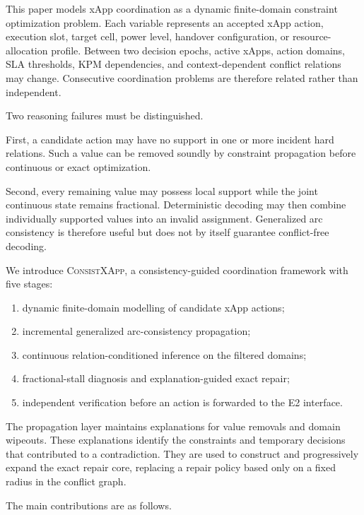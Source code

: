 \documentclass[pdflatex,sn-mathphys-num,iicol,oneside]{sn-jnl}
\newcommand{\method}{\textsc{ConsistXApp}}
\begin{document}
This paper models xApp coordination as a dynamic finite-domain
constraint optimization problem. Each variable represents an accepted
xApp action, execution slot, target cell, power level, handover
configuration, or resource-allocation profile. Between two decision
epochs, active xApps, action domains, SLA thresholds, KPM dependencies,
and context-dependent conflict relations may change. Consecutive
coordination problems are therefore related rather than independent.

Two reasoning failures must be distinguished.

First, a candidate action may have no support in one or more incident
hard relations. Such a value can be removed soundly by constraint
propagation before continuous or exact optimization.

Second, every remaining value may possess local support while the
joint continuous state remains fractional. Deterministic decoding may
then combine individually supported values into an invalid assignment.
Generalized arc consistency is therefore useful but does not by itself
guarantee conflict-free decoding.

We introduce \method, a consistency-guided coordination framework
with five stages:

\begin{enumerate}
    \item dynamic finite-domain modelling of candidate xApp actions;
    \item incremental generalized arc-consistency propagation;
    \item continuous relation-conditioned inference on the filtered
    domains;
    \item fractional-stall diagnosis and explanation-guided exact
    repair;
    \item independent verification before an action is forwarded to
    the E2 interface.
\end{enumerate}

The propagation layer maintains explanations for value removals and
domain wipeouts. These explanations identify the constraints and
temporary decisions that contributed to a contradiction. They are
used to construct and progressively expand the exact repair core,
replacing a repair policy based only on a fixed radius in the conflict
graph.

The main contributions are as follows.
\end{document}
